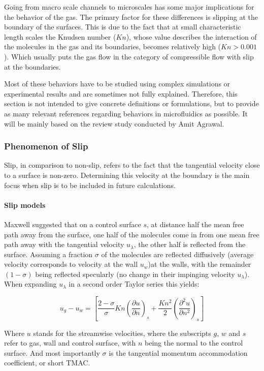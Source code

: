 Going from macro scale channels to microscales has some major implications for the behavior of the gas.
The primary factor for these differences is slipping at the boundary of the surfaces.
This is due to the fact that at small characteristic length scales the Knudsen number ($Kn$), whose value describes the interaction of the molecules in the gas and its boundaries, becomes relatively high ($Kn > 0.001$).
Which usually puts the gas flow in the category of compressible flow with slip at the boundaries.

Most of these behaviors have to be studied using complex simulations or experimental results and are sometimes not fully explained.
Therefore, this section is not intended to give concrete definitions or formulations, but to provide as many relevant references regarding behaviors in microfluidics as possible.
It will be mainly based on the review study conducted by Amit Agrawal.
\cite{agrawal_comprehensive_2011}

\subsubsection*{Phenomenon of Slip}
Slip, in comparison to non-slip, refers to the fact that the tangential velocity close to a surface is non-zero.
Determining this velocity at the boundary is the main focus when slip is to be included in future calculations.

\paragraph*{Slip models}
Maxwell suggested that on a control surface $s$, at distance half the mean free path away from the surface, one half of the molecules come in from one mean free path away with the tangential velocity $u_\lambda$, the other half is reflected from the surface.
Assuming a fraction $\sigma$ of the molecules are reflected diffusively (average velocity corresponds to velocity at the wall $u_w$)at the walls, with the remainder $(1-\sigma)$ being reflected specularly (no change in their impinging velocity $u_\lambda$).
When expanding $u_\lambda$ in a second order Taylor series this yields:

$$
	u_g - u_w =
	\left[
		\frac{2-\sigma}{\sigma}Kn\left(\frac{\partial u}{\partial n}\right)_s
		+ \frac{Kn^2}{2} \left(\frac{\partial^2 u}{\partial n^2}\right)_s
	\right]
$$ 

Where $u$ stands for the streamwise velocities, where the subscripts $g$, $w$ and $s$ refer to gas, wall and control surface, with $n$ being the normal to the control surface.
And most importantly $\sigma$ is the tangential momentum accommodation coefficient, or short TMAC.

